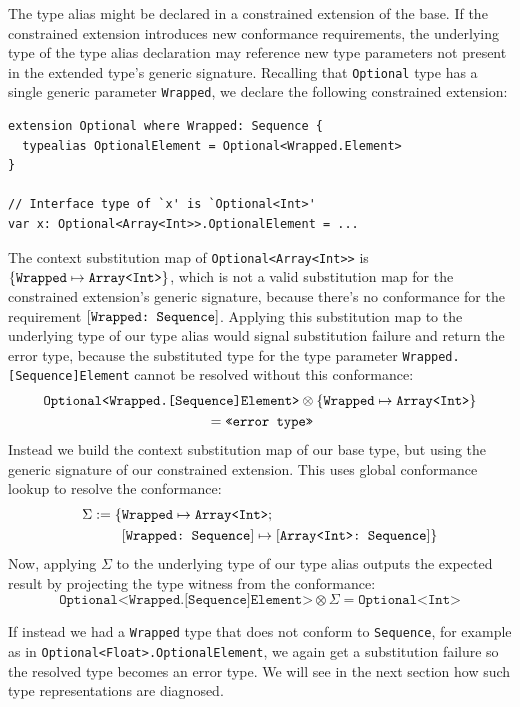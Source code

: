\documentclass[../generics]{subfiles}
\begin{document}
The type alias might be declared in a constrained extension of the base. If the constrained extension introduces new conformance requirements, the underlying type of the type alias declaration may reference new type parameters not present in the extended type's generic signature. Recalling that \texttt{Optional} type has a single generic parameter \texttt{Wrapped}, we declare the following constrained extension:
\begin{Verbatim}
extension Optional where Wrapped: Sequence {
  typealias OptionalElement = Optional<Wrapped.Element>
}

// Interface type of `x' is `Optional<Int>'
var x: Optional<Array<Int>>.OptionalElement = ...
\end{Verbatim}
The context substitution map of \texttt{Optional<Array<Int>>} is $\{\texttt{Wrapped} \mapsto \texttt{Array<Int>}\}$, which is not a valid substitution map for the constrained extension's generic signature, because there's no conformance for the requirement $[\texttt{Wrapped:~Sequence}]$. Applying this substitution map to the underlying type of our type alias would signal substitution failure and return the error type, because the substituted type for the type parameter \texttt{Wrapped.[Sequence]Element} cannot be resolved without this conformance:
\begin{multline*}\texttt{Optional<Wrapped.[Sequence]Element>}\otimes\{\texttt{Wrapped} \mapsto \texttt{Array<Int>}\}\\
{} =\texttt{<<error type>>}
\end{multline*}
Instead we build the context substitution map of our base type, but using the generic signature of our constrained extension. This uses global conformance lookup to resolve the conformance:
\begin{align*}
\Sigma := \{&\texttt{Wrapped} \mapsto \texttt{Array<Int>};\,\\
&[\texttt{Wrapped:~Sequence}] \mapsto [\texttt{Array<Int>:~Sequence}]\}
\end{align*}
Now, applying $\Sigma$ to the underlying type of our type alias outputs the expected result by projecting the type witness from the conformance:
\[\texttt{Optional<Wrapped.[Sequence]Element>}\otimes\Sigma = \texttt{Optional<Int>}\]

If instead we had a \texttt{Wrapped} type that does not conform to \texttt{Sequence}, for example as in \texttt{Optional<Float>.OptionalElement}, we again get a substitution failure so the resolved type becomes an error type. We will see in the next section how such type representations are diagnosed.
\end{document}
